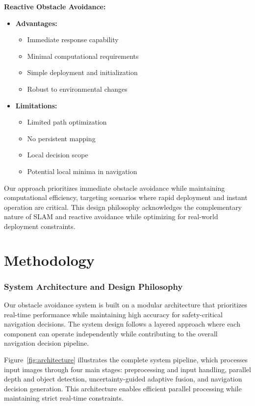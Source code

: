 \documentclass[12pt,oneside]{book}
\newcommand{\figref}[1]{Figure~\ref{#1}}
\begin{document}
\textbf{Reactive Obstacle Avoidance:}
\begin{itemize}
    \item \textbf{Advantages:}
    \begin{itemize}
        \item Immediate response capability
        \item Minimal computational requirements
        \item Simple deployment and initialization
        \item Robust to environmental changes
    \end{itemize}
    \item \textbf{Limitations:}
    \begin{itemize}
        \item Limited path optimization
        \item No persistent mapping
        \item Local decision scope
        \item Potential local minima in navigation
    \end{itemize}
\end{itemize}

Our approach prioritizes immediate obstacle avoidance while maintaining computational efficiency, targeting scenarios where rapid deployment and instant operation are critical. This design philosophy acknowledges the complementary nature of SLAM and reactive avoidance while optimizing for real-world deployment constraints.

\chapter{Methodology}

\subsection{System Architecture and Design Philosophy}

Our obstacle avoidance system is built on a modular architecture that prioritizes real-time performance while maintaining high accuracy for safety-critical navigation decisions. The system design follows a layered approach where each component can operate independently while contributing to the overall navigation decision pipeline.

\figref{fig:architecture} illustrates the complete system pipeline, which processes input images through four main stages: preprocessing and input handling, parallel depth and object detection, uncertainty-guided adaptive fusion, and navigation decision generation. This architecture enables efficient parallel processing while maintaining strict real-time constraints.
\end{document}
